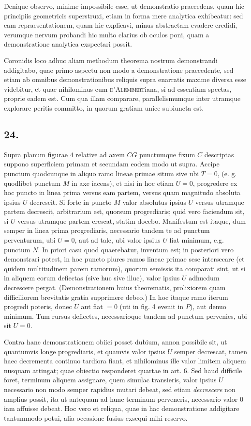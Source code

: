 \documentclass[twoside,12pt, showframe]{memoir}
\begin{document}
Denique observo, minime impossibile esse, ut demonstratio praecedens, quam hic principiis geometricis superstruxi, etiam in forma mere analytica exhibeatur: sed eam repraesentationem, quam hic explicavi, minus abstractam evadere credidi, verumque nervum probandi hic multo clarius ob oculos poni, quam a demonstratione analytica exspectari possit. 

Coronidis loco adhuc aliam methodum theorema nostrum demonstrandi addigitabo, quae primo aspectu non modo a demonstratione praecedente, sed etiam ab omnibus demonstrationibus reliquis supra enarratis maxime diversa esse videbitur, et quae nihilominus cum \textsc{d'Alembert}iana, si ad essentiam spectas, proprie eadem est. Cum qua illam comparare, parallelismumque inter utramque explorare peritis committo, in quorum gratiam unice subiuncta est.

\subsection*{24.}
 
Supra planum figurae \(4\) relative ad axem \(CG\) punctumque fixum \(C\) descriptas suppono superficiem primam et secundam eodem modo ut supra.  Accipe punctum quodcunque in aliquo ramo lineae primae situm sive ubi \(T= 0\), (e. g. quodlibet punctum \(M\) in axe iacens), et nisi in hoc etiam \(U= 0\), progredere ex hoc puncto in linea prima versus eam partem, versus quam magnitudo absoluta ipsius \(U\) decrescit. Si forte in puncto \(M\) valor absolutus ipsius \(U\) versus utramque partem decrescit, arbitrarium est, quorsum progrediaris; quid vero faciendum sit, si \(U\) versus utramque partem crescat, statim docebo. Manifestum est itaque, dum semper in linea prima progrediaris, necessario tandem te ad punctum perventurum, ubi \(U = 0\), aut ad tale, ubi valor ipsius \(U\) fiat minimum, e.g. punctum \(N\). In priori casu quod quaerebatur, inventum est; in posteriori vero demonstrari potest, in hoc puncto plures ramos lineae primae sese intersecare (et quidem multitudinem parem ramorum), quorum semissis ita comparati sint, ut si in aliquem eorum defiectas (sive huc sive illuc), valor ipsius \(U\) adhucdum decrescere pergat. (Demonstrationem huius theorematis, prolixiorem quam difficiliorem brevitatis gratia supprimere debeo.) In hoc itaque ramo iterum progredi poteris, donec \(U\) aut fiat \(= 0\) (uti in fig. 4 evenit in \(P\)), aut denuo minimum. Tum rursus defiectes, necessarioque tandem ad punctum pervenies, ubi sit  \(U = 0\).

Contra hanc demonstrationem obiici posset dubium, annon possibile sit, ut quantumvis longe progrediaris, et quamvis valor ipsius \(U\) semper decrescat, tamen haec decrementa continuo tardiora fiant, et nihilominus ille valor limitem aliquem nusquam attingat; quae obiectio responderet quartae in art. 6. Sed haud difficile foret, terminum aliquem assignare, quem simulac transieris, valor ipsius \(U\) necessario non modo semper rapidius mutari debeat, sed etiam \textit{decrescere} non amplius possit, ita ut antequam ad hunc terminum perveneris, necessario valor \(0\) iam affuisse debeat. Hoc vero et reliqua, quae in hac demonstratione addigitare tantummodo potui, alia occasione fusius exsequi mihi reservo.
\end{document}
